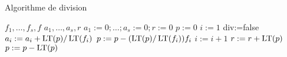 \begin{algorithm}

\caption{Algorithme de division}

\begin{algorithmic}
\REQUIRE $f_1,\ldots,f_s,f$
\ENSURE $a_1,\ldots,a_s,r$
\STATE $a_1 :=0 ;\ldots ; a_s:=0 ; r:=0$
\STATE $p:=0$
\STATE $i:=1$
\STATE div:=false 
\STATE $a_i:= a_i+\operatorname{\mathrm{LT}} (p)/\operatorname{\mathrm{LT}} (f_i)$
\STATE $p:=p-(\operatorname{\mathrm{LT}}(p)/\operatorname{\mathrm{LT}} (f_i)) f_i$
\ELSE
\STATE $i:=i+1$
\ENDIF
\ENDWHILE
{}
\STATE $r:=r+\operatorname{\mathrm{LT}} (p)$
\STATE $p:=p-\operatorname{\mathrm{LT}} (p) $
\ENDIF
\ENDWHILE
\end{algorithmic}

\end{algorithm}